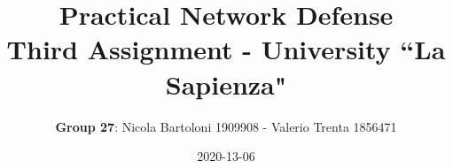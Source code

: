 \documentclass[letterpaper,11pt]{article}
\begin{document}
\title{\textbf{Practical Network Defense}\\ \bigskip \large Third Assignment - University ``La Sapienza"}
\date{2020-13-06}
\author{\textbf{Group 27}: Nicola Bartoloni 1909908 - Valerio Trenta 1856471}
\maketitle


\newpage


\newpage

\newpage

\newpage

\newpage
\end{document}
